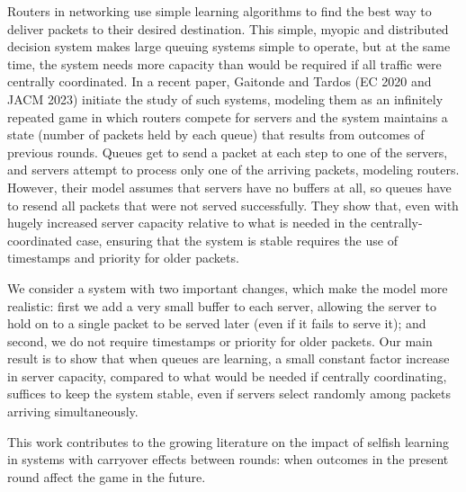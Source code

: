 Routers in networking use simple learning algorithms to find the best way to deliver packets to their desired destination. This simple, myopic and distributed decision system makes large queuing systems simple to operate, but at the same time, the system needs more capacity than would be required if all traffic were centrally coordinated. In a recent paper, Gaitonde and Tardos (EC 2020 and JACM 2023) initiate the study of such systems, modeling them as an infinitely repeated game in which routers compete for servers and the system maintains a state (number of packets held by each queue) that results from outcomes of previous rounds. Queues get to send a packet at each step to one of the servers, and servers attempt to process only one of the arriving packets, modeling routers. However, their model assumes that servers have no buffers at all, so queues have to resend all packets that were not served successfully. They show that, even with hugely increased server capacity relative to what is needed in the centrally-coordinated case, ensuring that the system is stable requires the use of timestamps and priority for older packets.\vspace{3pt}

We consider a system with two important changes, which make the model more realistic: first we add a very small buffer to each server, allowing the server to hold on to a single packet to be served later (even if it fails to serve it); and second, we do not require timestamps or priority for older packets. Our main result is to show that when queues are learning, a small constant factor increase in server capacity, compared to what would be needed if centrally coordinating, suffices to keep the system stable, even if servers select randomly among packets arriving simultaneously. \vspace{3pt}

This work contributes to the growing literature on the impact of selfish learning in systems with carryover effects between rounds: when outcomes in the present round affect the game in the future.
